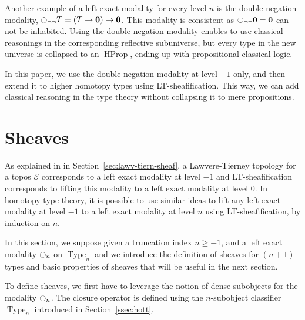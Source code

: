 \documentclass[preprint,9pt,numbers]{sigplanconf}
\DeclareMathOperator{\Type}{Type}
\DeclareMathOperator{\HProp}{HProp}
\newcommand{\modal}{\ensuremath{\ocircle}}
\newcommand \E {\mathcal{E}}
\newcommand \zero {\mathbf{0}}
\begin{document}
Another example of a left exact modality for every level $n$ is the
double negation modality,
$\modal_{\lnot\lnot} T = (T \to \zero) \to \zero$.
%
This modality is consistent as $\modal_{\lnot\lnot} \zero = \zero$ can
not be inhabited.
%
Using the double negation modality enables to use classical reasonings
in the corresponding reflective subuniverse, but every type in the new
universe is collapsed to an $\HProp$, ending up with propositional
classical logic.

In this paper, we use the double negation modality at level $-1$ only,
and then extend it to higher homotopy types using LT-sheafification. This
way, we can add classical reasoning in the type theory without
collapsing it to mere propositions.




\section{Sheaves}
\label{sec:sheaves}

As explained in in Section~\ref{sec:lawv-tiern-sheaf}, a
Lawvere-Tierney topology for a topos $\E$ corresponds to a left exact
modality at level $-1$
%
and LT-sheafification corresponds to lifting this modality to a left
exact modality at level $0$.
%
In homotopy type theory, it is possible to use similar ideas to lift
any left exact modality at level $-1$ to a left exact modality at level
$n$ using LT-sheafification, by induction on $n$.

In this section, we suppose given a truncation index $n\geqslant -1$,
and a left exact modality $\modal_n$ on $\Type_n$ and we introduce the
definition of sheaves for $(n+1)$-types and basic properties of
sheaves that will be useful in the next section. 



To define sheaves, we first have to leverage the notion of dense
subobjects for the modality $\modal_n$. The closure operator is defined
using the $n$-subobject classifier $\Type_n$ introduced in
Section~\ref{ssec:hott}.
\end{document}
